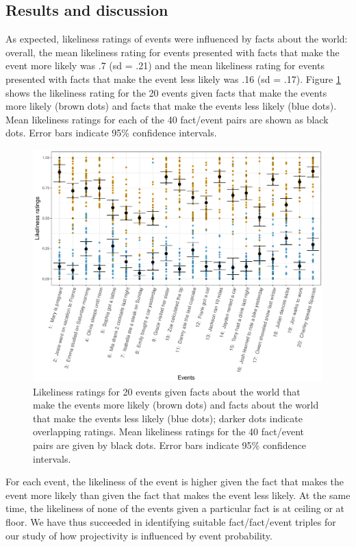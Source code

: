 \documentclass[11pt,fleqn]{article}
\newcommand{\6}{\mbox{$[\hspace*{-.6mm}[$}}
\newcommand{\9}{\mbox{$]\hspace*{-.6mm}]$}}
\begin{document}
\subsection{Results and discussion}

As expected, likeliness ratings of events were influenced by facts about the world: overall, the mean likeliness rating for events presented with facts that make the event more likely was .7 (sd = .21) and the mean likeliness rating for events presented with facts that make the event less likely was .16 (sd = .17). Figure \ref{f-priors} shows the likeliness rating for the 20 events given facts that make the events more likely (brown dots) and facts that make the events less likely (blue dots). Mean likeliness ratings for each of the 40 fact/event pairs are shown as black dots. Error bars indicate 95\% confidence intervals.

\begin{figure}
\centering

\includegraphics[width=.8\paperwidth]{../results/1-prior/graphs/target-ratings}

\caption{Likeliness ratings for 20 events given facts about the world that make the events more likely (brown dots) and facts about the world that make the events less likely (blue dots); darker dots indicate overlapping ratings. Mean likeliness ratings for the 40 fact/event pairs are given by black dots. Error bars indicate 95\% confidence intervals.}\label{f-priors}
\end{figure}

For each event, the likeliness of the event is higher given the fact that makes the event more likely than given the fact that makes the event less likely. At the same time, the likeliness of none of the events given a particular fact is at ceiling or at floor. We have thus succeeded in identifying suitable fact/fact/event triples for our study of how projectivity is influenced by event probability.
\end{document}
